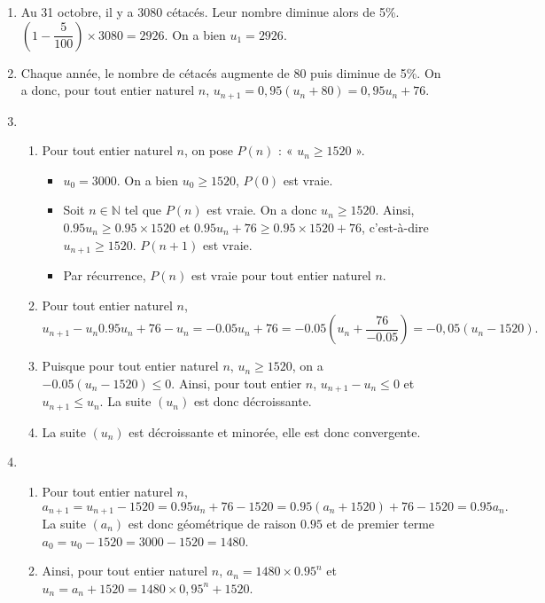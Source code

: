 \documentclass[11pt,fleqn, openany]{book} %
\begin{document}
\begin{solution}\hspace{0pt}
\begin{enumerate}
\item Au 31 octobre, il y a 3080 cétacés. Leur nombre diminue alors de 5\%. $\left(1-\dfrac{5}{100}\right) \times 3080 = 2926$. On a bien \(u_1=2926\).

\item Chaque année, le nombre de cétacés augmente de 80 puis diminue de 5\%. On a donc, pour tout entier naturel $n$, $u_{n+1} = 0,95(u_n+80)=0,95u_n +76$.

\item \begin{enumerate}
\item Pour tout entier naturel $n$, on pose $P(n)$ : « $u_n \geqslant 1520$ ».
\begin{itemize}
\item $u_0=3000$. On a bien $u_0 \geqslant 1520$, $P(0)$ est vraie.
\item Soit $n\in\mathbb{N}$ tel que $P(n)$ est vraie. On a donc $u_n \geqslant 1520$. Ainsi, $0.95u_n \geqslant 0.95 \times 1520$ et $0.95u_n +76 \geqslant 0.95 \times 1520 + 76$, c'est-à-dire $u_{n+1} \geqslant 1520$. $P(n+1)$ est vraie.
\item Par récurrence, $P(n)$ est vraie pour tout entier naturel $n$.
\end{itemize}

\item Pour tout entier naturel $n$, \[u_{n+1}-u_n 0.95u_n+76-u_n=-0.05u_n+76=-0.05\left(u_n+\dfrac{76}{-0.05}\right)= -0,05(u_n -1520).\]

\item Puisque pour tout entier naturel $n$, $u_n\geqslant 1520$, on a $-0.05(u_n-1520) \leqslant 0$. Ainsi, pour tout entier $n$, $u_{n+1}-u_n \leqslant 0$ et $u_{n+1}\leqslant u_n$. La suite $(u_n)$ est donc décroissante. 

\item La suite $(u_n)$ est décroissante et minorée, elle est donc convergente.\end{enumerate}

\item \begin{enumerate}
\item Pour tout entier naturel $n$, \[a_{n+1}=u_{n+1}-1520=0.95u_n+76-1520=0.95(a_n+1520)+76-1520=0.95a_n.\]
La suite $(a_n)$ est donc géométrique de raison $0.95$ et de premier terme $a_0=u_0-1520=3000-1520=1480$. 
\item Ainsi, pour tout entier naturel $n$, $a_n = 1480 \times 0.95^n$ et $u_n = a_n+1520 = 1480 \times 0,95^n +1520$.


\end{enumerate}
\end{enumerate}
\end{solution}
\end{document}
